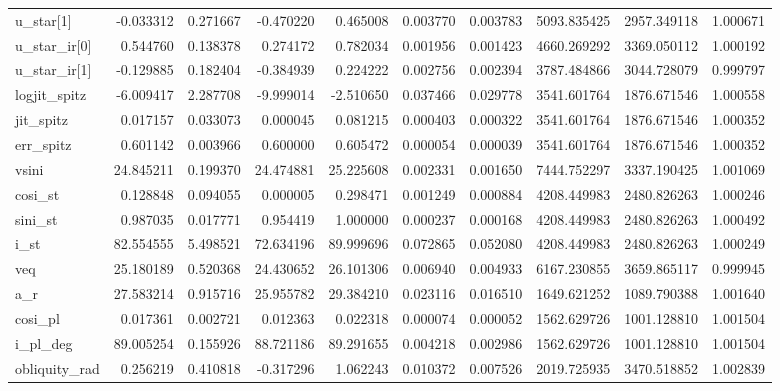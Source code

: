 \begin{tabular}{lrrrrrrrrr}
u\_star[1]     &   -0.033312 &   0.271667 &   -0.470220 &    0.465008 &   0.003770 &  0.003783 &  5093.835425 &  2957.349118 &  1.000671 \\
u\_star\_ir[0]  &    0.544760 &   0.138378 &    0.274172 &    0.782034 &   0.001956 &  0.001423 &  4660.269292 &  3369.050112 &  1.000192 \\
u\_star\_ir[1]  &   -0.129885 &   0.182404 &   -0.384939 &    0.224222 &   0.002756 &  0.002394 &  3787.484866 &  3044.728079 &  0.999797 \\
logjit\_spitz  &   -6.009417 &   2.287708 &   -9.999014 &   -2.510650 &   0.037466 &  0.029778 &  3541.601764 &  1876.671546 &  1.000558 \\
jit\_spitz     &    0.017157 &   0.033073 &    0.000045 &    0.081215 &   0.000403 &  0.000322 &  3541.601764 &  1876.671546 &  1.000352 \\
err\_spitz     &    0.601142 &   0.003966 &    0.600000 &    0.605472 &   0.000054 &  0.000039 &  3541.601764 &  1876.671546 &  1.000352 \\
vsini         &   24.845211 &   0.199370 &   24.474881 &   25.225608 &   0.002331 &  0.001650 &  7444.752297 &  3337.190425 &  1.001069 \\
cosi\_st       &    0.128848 &   0.094055 &    0.000005 &    0.298471 &   0.001249 &  0.000884 &  4208.449983 &  2480.826263 &  1.000246 \\
sini\_st       &    0.987035 &   0.017771 &    0.954419 &    1.000000 &   0.000237 &  0.000168 &  4208.449983 &  2480.826263 &  1.000492 \\
i\_st          &   82.554555 &   5.498521 &   72.634196 &   89.999696 &   0.072865 &  0.052080 &  4208.449983 &  2480.826263 &  1.000249 \\
veq           &   25.180189 &   0.520368 &   24.430652 &   26.101306 &   0.006940 &  0.004933 &  6167.230855 &  3659.865117 &  0.999945 \\
a\_r           &   27.583214 &   0.915716 &   25.955782 &   29.384210 &   0.023116 &  0.016510 &  1649.621252 &  1089.790388 &  1.001640 \\
cosi\_pl       &    0.017361 &   0.002721 &    0.012363 &    0.022318 &   0.000074 &  0.000052 &  1562.629726 &  1001.128810 &  1.001504 \\
i\_pl\_deg      &   89.005254 &   0.155926 &   88.721186 &   89.291655 &   0.004218 &  0.002986 &  1562.629726 &  1001.128810 &  1.001504 \\
obliquity\_rad &    0.256219 &   0.410818 &   -0.317296 &    1.062243 &   0.010372 &  0.007526 &  2019.725935 &  3470.518852 &  1.002839 \\

\end{tabular}
